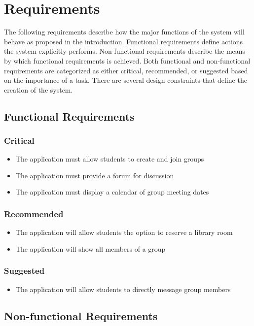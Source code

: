 \chapter{Requirements}
The following requirements describe how the major functions of the system will behave as proposed in the introduction. Functional requirements define actions the system explicitly performs. Non-functional requirements describe the means by which functional requirements is achieved. Both functional and non-functional requirements are categorized as either critical, recommended, or suggested based on the importance of a task. There are several design constraints that define the creation of the system.

\section{Functional Requirements}
\subsection{Critical}
	\begin{itemize}
		\item The application must allow students to create and join groups
		\item The application must provide a forum for discussion
		\item The application must display a calendar of group meeting dates
	\end{itemize}
\subsection{Recommended}
	\begin{itemize}
		\item The application will allow students the option to reserve a library room
		\item The application will show all members of a group
	\end{itemize}
\subsection{Suggested}
	\begin{itemize}
		\item The application will allow students to directly message group members
	\end{itemize}

\section{Non-functional Requirements}
